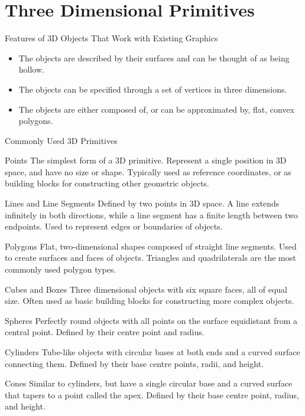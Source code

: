 \documentclass[../COS3712_Notes.tex]{subfiles}
\begin{document}
    \section{Three Dimensional Primitives}
      \begin{sidenote}{Features of 3D Objects That Work with Existing Graphics}
        $ $\vspace{-1em}
        \begin{itemize}
          \item The objects are described by their surfaces and can be thought of as being hollow.
          \item The objects can be specified through a set of vertices in three dimensions.
          \item The objects are either composed of, or can be approximated by, flat, convex polygons.
        \end{itemize}
      \end{sidenote}

      \begin{sidenote}[title after break={Commonly Used 3D Primitives (Continued)}]{Commonly Used 3D Primitives}
        $ $\vspace{-1em}
        \begin{descriptimize}
          \item[Points] The simplest form of a 3D primitive.
            Represent a single position in 3D space, and have no size or shape.
            Typically used as reference coordinates,
            or as building blocks for constructing other geometric objects.
          \item[Lines and Line Segments] Defined by two points in 3D space.
            A line extends infinitely in both directions, while a line segment has a finite length
            between two endpoints.
            Used to represent edges or boundaries of objects.
            \pagebreak
          \item[Polygons] Flat, two-dimensional shapes composed of straight line segments.
            Used to create surfaces and faces of objects.
            Triangles and quadrilaterals are the most commonly used polygon types.
          \item[Cubes and Boxes] Three dimensional objects with six square faces,
            all of equal size.
            Often used as basic building blocks for constructing more complex objects.
          \item[Spheres] Perfectly round objects with all points on the surface equidistant
            from a central point.
            Defined by their centre point and radius.
          \item[Cylinders] Tube-like objects with circular bases at both ends and a curved surface
            connecting them.
            Defined by their base centre points, radii, and height.
          \item[Cones] Similar to cylinders, but have a single circular base and a curved surface
            that tapers to a point called the apex.
            Defined by their base centre point, radius, and height.
        \end{descriptimize}
      \end{sidenote}
\end{document}
